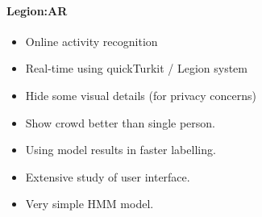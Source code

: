 \paragraph{Legion:AR} \cite{lasecki2013realtime}
\begin{itemize}
  \item Online activity recognition
  \item Real-time using quickTurkit / Legion system
  \item Hide some visual details (for privacy concerns)
  \item Show crowd better than single person.
  \item Using model results in faster labelling.
  \item Extensive study of user interface.
  \item Very simple HMM model.
\end{itemize}


